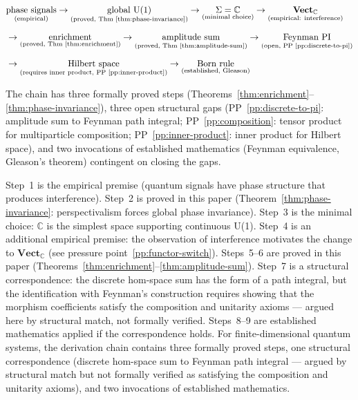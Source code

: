 \documentclass[12pt,a4paper]{article}
\begin{document}
\begin{equation*}
\begin{aligned}
& \underset{\text{(empirical)}}{\text{phase signals}} \to \underset{\text{(proved, Thm~\ref{thm:phase-invariance})}}{\text{global U(1)}} \to \underset{\text{(minimal choice)}}{\Sigma = \mathbb{C}} \to \underset{\text{(empirical: interference)}}{\mathbf{Vect}_{\mathbb{C}}} \\[6pt]
& \to \underset{\text{(proved, Thm~\ref{thm:enrichment})}}{\text{enrichment}} \to \underset{\text{(proved, Thm~\ref{thm:amplitude-sum})}}{\text{amplitude sum}} \to \underset{\text{(open, PP~\ref{pp:discrete-to-pi})}}{\text{Feynman PI}} \\[6pt]
& \to \underset{\text{(requires inner product, PP~\ref{pp:inner-product})}}{\text{Hilbert space}} \to \underset{\text{(established, Gleason)}}{\text{Born rule}}
\end{aligned}
\end{equation*}

The chain has three formally proved steps (Theorems~\ref{thm:enrichment}--\ref{thm:phase-invariance}), three open structural gaps (PP~\ref{pp:discrete-to-pi}: amplitude sum to Feynman path integral; PP~\ref{pp:composition}: tensor product for multiparticle composition; PP~\ref{pp:inner-product}: inner product for Hilbert space), and two invocations of established mathematics (Feynman equivalence, Gleason's theorem) contingent on closing the gaps.

Step~1 is the empirical premise (quantum signals have phase structure that produces interference). Step~2 is proved in this paper (Theorem~\ref{thm:phase-invariance}: perspectivalism forces global phase invariance). Step~3 is the minimal choice: $\mathbb{C}$ is the simplest space supporting continuous U(1). Step~4 is an additional empirical premise: the observation of interference motivates the change to $\mathbf{Vect}_{\mathbb{C}}$ (see pressure point~\ref{pp:functor-switch}). Steps~5--6 are proved in this paper (Theorems~\ref{thm:enrichment}--\ref{thm:amplitude-sum}). Step~7 is a structural correspondence: the discrete hom-space sum has the form of a path integral, but the identification with Feynman's construction requires showing that the morphism coefficients satisfy the composition and unitarity axioms --- argued here by structural match, not formally verified. Steps~8--9 are established mathematics applied if the correspondence holds. For finite-dimensional quantum systems, the derivation chain contains three formally proved steps, one structural correspondence (discrete hom-space sum to Feynman path integral --- argued by structural match but not formally verified as satisfying the composition and unitarity axioms), and two invocations of established mathematics.
\end{document}
